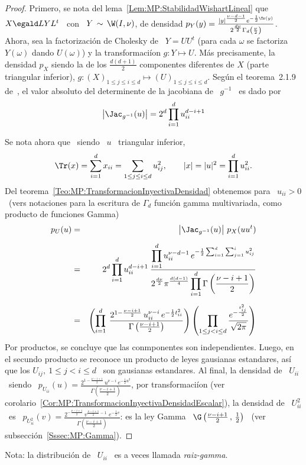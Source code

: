 \begin{proof}
  Primero, se nota del lema~\ref{Lem:MP:StabilidadWishartLineal} que \ $X \egald
  L  Y  L^t$  \  con  \  $Y  \, \sim  \,  \W(I,\nu)$,  de  densidad  $p_Y(y)  =
  \frac{|y|^{\frac{\nu-d-1}{2}}    e^{-\frac12    \Tr(y)}}{2^{\frac{d   \nu}{2}}
    \Gamma_d\left(  \frac{\nu}{2} \right)}$.  Ahora, sea  la  factorizaci\'on de
  Cholesky de  \ $Y =  U U^t$ (\ie  para cada $\omega$ se  factoriza $Y(\omega)$
  dando  $U(\omega)$)   y  la  transformaci\'ion   $g:  Y  \mapsto   U$.   M\'as
  precisamente,  la  densidad  $p_X$   siendo  la  de  los  $\frac{d  (d+1)}{2}$
  componentes diferentes  de $X$ (parte  triangular inferior), $g: (X)_{1  \le j
    \le i \le d} \mapsto (U)_{1 \le  j \le i \le d}$.
  Seg\'un el  teorema~2.1.9 de~\cite{Mui82}, el valor  absoluto del determinente
  de la jacobiana de \ $g^{-1}$ \ es dado por
  \[
  \left| \Jac_{g^{-1}}(u) \right| = 2^d \prod_{i=1}^d u_{ii}^{d-i+1}
  \]
  
  Se nota ahora que \ siendo \ $u$ \ triangular inferior,
  \[
  \Tr(x) =  \sum_{i=1}^d x_{ii}  = \sum_{1 \le j \le i \le d} u_{ij}^2, \qquad
  |x| = |u|^2 = \prod_{i=1}^d u_{ii}^2.
  \]
  Del  teorema~\ref{Teo:MP:TransformacionInyectivaDensidad}   obtenemos  para  \
  $u_{ii}  > 0$ \  (vers notaciones  para la  escritura de  $\Gamma_d$ funci\'on
  gamma multivariada, como producto de funciones Gamma)
  \begin{eqnarray*}
  p_U(u) & = &\left| \Jac_{g^{-1}}(u) \right| \,  p_X(u u^t) \\[2mm]
  & = & 2^d \prod_{i=1}^d u_{ii}^{d-i+1} \: \frac{\displaystyle \prod_{i=1}^d
  u_{ii}^{\nu-d-1} \, e^{ -\frac12 \sum_{i=1}^d \sum_{j=1}^i  u_{ij}^2}}{\displaystyle
  2^{\frac{d \nu}{2}} \pi^{\frac{d (d-1)}{4}} \prod_{i=1}^d \Gamma\left(
  \frac{\nu-i+1}{2} \right)}\\[2mm]
  & = & \left( \prod_{i=1}^d \: \frac{2^{1 - \frac{\nu-i+1}{2}} \,
  u_{ii}^{\nu-i} \, e^{-\frac12 t_{ii}^2}}{\Gamma\left( \frac{\nu-i+1}{2} \right)}
  \right) \left( \prod_{1 \le j < i \le d} \frac{\displaystyle
  e^{-\frac{t_{ij}^2}{2}}}{\sqrt{2 \pi}} \right)
  \end{eqnarray*}
  Por productos, se concluye que  las conmponentes son independientes. Luego, en
  el secundo  producto se  reconoce un producto  de leyes  gausianas estandares,
  as\'i que los  $U_{ij}, \: 1 \le j  < i \le d$ \ son  gausianas estandares. Al
  final,   la   densidad  de   \   $U_{ii}$   \   siendo  \   $p_{U_{ii}}(u)   =
  \frac{2^{1-\frac{\nu-i+1}{2}}  \, u^{\nu-i} \,  e^{-\frac12 u^2}}{\Gamma\left(
      \frac{\nu-i+1}{2}      \right)}$,      por     transformaci\'ion      (ver
  corolario~\ref{Cor:MP:TransformacionInyectivaDensidadEscalar}), la densidad de
  \  $U_{ii}^2$  \  es  \  $p_{U_{ii}^2}(v)  =  \frac{2^{-\frac{\nu-i+1}{2}}  \,
    v^{\frac{\nu-i+1}{2}-1} \, \, e^{-\frac12 v}}{\Gamma\left( \frac{\nu-i+1}{2}
    \right)}$: es  la ley  Gamma \ $\G\left(  \frac{\nu-i+1}{2} \, ,  \, \frac12
  \right)$ \ (ver subsecci\'on~\ref{Sssec:MP:Gamma}).
\end{proof}
%
Nota: la distribuci\'on de \ $U_{ii}$ \ es a veces llamada {\em raiz-gamma}.

